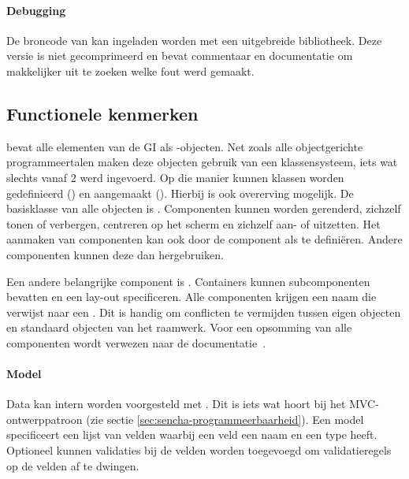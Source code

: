 
\paragraph{Debugging}
De broncode van \st{} kan ingeladen worden met een uitgebreide bibliotheek.  
Deze versie is niet gecomprimeerd en bevat commentaar en documentatie om makkelijker uit te zoeken welke fout werd gemaakt.

\subsection{Functionele kenmerken}
\st{} bevat alle elementen van de GI als \js{}-objecten.  
Net zoals alle objectgerichte programmeertalen maken deze objecten gebruik van een klassensysteem,  iets wat slechts vanaf \st{} 2 werd ingevoerd.  
Op die manier kunnen klassen worden gedefinieerd () en aangemaakt ().  
Hierbij is ook overerving mogelijk.  
De basisklasse van alle objecten is .  
Componenten kunnen worden gerenderd, zichzelf tonen of verbergen,  centreren op het scherm en zichzelf aan- of uitzetten.   
Het aanmaken van componenten kan ook door de component als  te definiëren.  
Andere componenten kunnen deze  dan hergebruiken.

Een andere belangrijke component is .  
Containers kunnen subcomponenten bevatten en een lay-out specificeren.  
Alle componenten krijgen een naam die verwijst naar een .  
Dit is handig om conflicten te vermijden tussen eigen objecten en standaard objecten van het raamwerk.  
Voor een opsomming van alle componenten wordt verwezen naar de documentatie~\cite{Inc.2013a}.

\paragraph{Model}
Data kan intern worden voorgesteld met .  
Dit is iets wat hoort bij het MVC-ontwerppatroon (zie sectie \ref{sec:sencha-programmeerbaarheid}).  
Een model specificeert een lijst van velden waarbij een veld een naam en een type heeft.  
Optioneel kunnen validaties bij de velden worden toegevoegd om validatieregels op de velden af te dwingen.  

